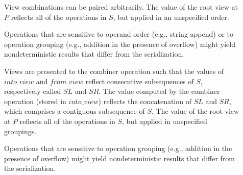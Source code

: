\begin{description}
\item[]

View combinations can be paired arbitrarily.
The value of the root view at
$P$
reflects all of the operations in
$S$,
but applied in an unspecified order.

\begin{note}
Operations that are sensitive to operand order
(e.g., string append)
or to operation grouping
(e.g., addition in the presence of overflow)
might yield nondeterministic results that differ from the serialization.
\end{note}

\item[]

Views are presented to the combiner operation
such that the values of
$into\_view$
and
$from\_view$
reflect consecutive subsequences of
$S$,
respectively called
$SL$ and $SR$.
The value computed by the combiner operation
(stored in
$into\_view$)
reflects the concatenation of
$SL$ and $SR$,
which comprises a contiguous subsequence of
$S$.
The value of the root view at
$P$
reflects all of the operations in
$S$,
but applied in unspecified groupings.

\begin{note}
Operations that are sensitive to operation grouping
(e.g., addition in the presence of overflow)
might yield nondeterministic results that differ from the serialization. 
\end{note}

\begin{comment}
\item[\tcode{\removed{_Serial}}]
\footnote{TODO:
Neither Cilk nor OpenMP provides this sort of guarantee.
Should CPLEX include it?
}
Views are presented to the combiner operation
such that the value of
$into\_view$
is the partial result reflecting an initial subsequence of
$S$,
called
$SL$,
and the value of
$from\_view$
is the partial result reflecting the next
(single) consecutive operation in
$S$
following
$SL$.
Thus, modifications are made to a single view
(ultimately the root view)
in the same order as for the serialization.

\begin{note}
It is likely that the implementation
will need to suppress concurrent execution of tasks
in order to ensure this (fully deterministic) modification order.
If so, there need not be more than one view,
and the combiner operation might not be invoked at all. 
\end{note}
\end{comment}
\end{description}

